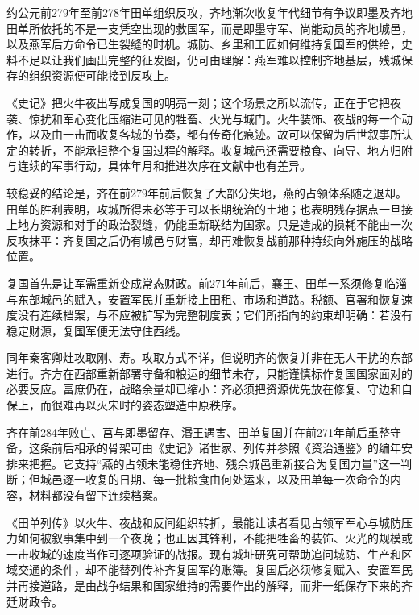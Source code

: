 \begin{event}{约公元前279年至前278年}{田单组织反攻，齐地渐次收复}{年代细节有争议}{即墨及齐地}
田单所依托的不是一支凭空出现的救国军，而是即墨守军、尚能动员的齐地城邑，以及燕军后方命令已生裂缝的时机。城防、乡里和工匠如何维持复国军的供给，史料不足以让我们画出完整的征发图，仍可由理解：燕军难以控制齐地基层，残城保存的组织资源便可能接到反攻上。

《史记》把火牛夜出写成复国的明亮一刻；这个场景之所以流传，正在于它把夜袭、惊扰和军心变化压缩进可见的牲畜、火光与城门。火牛装饰、夜战的每一个动作，以及由一击而收复各城的节奏，都有传奇化痕迹。故可以保留为后世叙事所认定的转折，不能承担整个复国过程的解释。收复城邑还需要粮食、向导、地方归附与连续的军事行动，具体年月和推进次序在文献中也有差异。

较稳妥的结论是，齐在前279年前后恢复了大部分失地，燕的占领体系随之退却。田单的胜利表明，攻城所得未必等于可以长期统治的土地；也表明残存据点一旦接上地方资源和对手的政治裂缝，仍能重新联结为国家。只是造成的损耗不能由一次反攻抹平：齐复国之后仍有城邑与财富，却再难恢复战前那种持续向外施压的战略位置。
\end{event}

复国首先是让军需重新变成常态财政。前271年前后，襄王、田单一系须修复临淄与东部城邑的赋入，安置军民并重新接上田租、市场和道路。税额、官署和恢复速度没有连续档案，与不应被扩写为完整制度表；它们所指向的约束却明确：若没有稳定财源，复国军便无法守住西线。

同年秦客卿灶攻取刚、寿。攻取方式不详，但说明齐的恢复并非在无人干扰的东部进行。齐方在西部重新部署守备和粮运的细节未存，只能谨慎标作复国国家面对的必要反应。富庶仍在，战略余量却已缩小：齐必须把资源优先放在修复、守边和自保上，而很难再以灭宋时的姿态塑造中原秩序。

\begin{debate}
齐在前284年败亡、莒与即墨留存、湣王遇害、田单复国并在前271年前后重整守备，这条前后相承的骨架可由《史记》诸世家、列传并参照《资治通鉴》的编年安排来把握。它支持“燕的占领未能稳住齐地、残余城邑重新接合为复国力量”这一判断；但城邑逐一收复的日期、每一批粮食由何处运来，以及田单每一次命令的内容，材料都没有留下连续档案。

《田单列传》以火牛、夜战和反间组织转折，最能让读者看见占领军军心与城防压力如何被叙事集中到一个夜晚；也正因其锋利，不能把牲畜的装饰、火光的规模或一击收城的速度当作可逐项验证的战报。现有城址研究可帮助追问城防、生产和区域交通的条件，却不能替列传补齐复国军的账簿。复国后必须修复赋入、安置军民并再接道路，是由战争结果和国家维持的需要作出的解释，而非一纸保存下来的齐廷财政令。
\end{debate}


